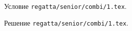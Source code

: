 \problem
Условие \texttt{regatta/senior/combi/1.tex}.

\solution Решение \texttt{regatta/senior/combi/1.tex}.
\endproblem
